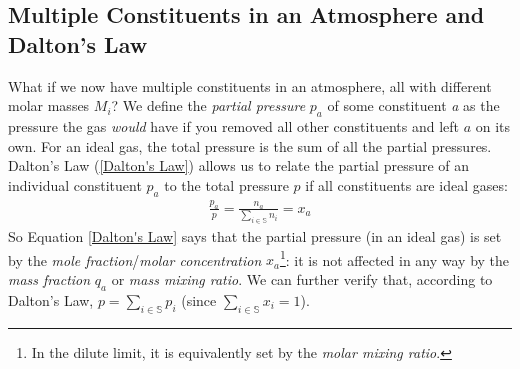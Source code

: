 \subsection{Multiple Constituents in an Atmosphere and Dalton's Law}\label{Multiple Dalt}

What if we now have multiple constituents in an atmosphere, all with different molar masses $M_i$? We define the \textit{partial pressure} $p_a$ of some constituent \textit{a} as the pressure the gas \textit{would} have if you removed all other constituents and left $a$ on its own. For an ideal gas, the total pressure is the sum of all the partial pressures. Dalton's Law (\ref{Dalton's Law}) allows us to relate the partial pressure of an individual constituent $p_a$ to the total pressure $p$ if all constituents are ideal gases:
\begin{align}\label{Dalton's Law}
    \boxed{\frac{p_a}{p}=\frac{n_a}{\sum\limits_{i\in\mathbb{S}} n_i}=x_a}
\end{align}
So Equation \ref{Dalton's Law} says that the partial pressure (in an ideal gas) is set by the \textit{mole fraction}/\textit{molar concentration} $x_a$\footnote{
    In the dilute limit, it is equivalently set by the \textit{molar mixing ratio}.
}: it is not affected in any way by the \textit{mass fraction} $q_a$ or \textit{mass mixing ratio}. We can further verify that, according to Dalton's Law, $p=\sum\limits_{i\in\mathbb{S}} p_i$ (since $\sum\limits_{i\in\mathbb{S}} x_i=1$).

